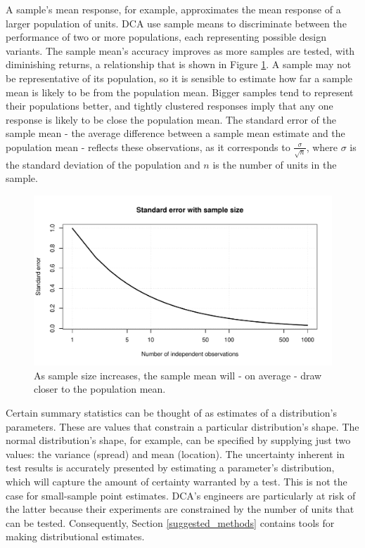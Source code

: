 \documentclass[11pt,a4paper,article]{memoir} %
\begin{document}
 \par
A sample's mean response, for example, approximates the mean response of a larger population of units. DCA use sample means to discriminate between the performance of two or more populations, each representing possible design variants. The sample mean's accuracy improves as more samples are tested, with diminishing returns, a relationship that is shown in Figure \ref{fig:se_with_sample_size}. A sample may not be representative of its population, so it is sensible to estimate how far a sample mean is likely to be from the population mean. Bigger samples tend to represent their populations better, and tightly clustered responses imply that any one response is likely to be close the population mean. The standard error of the sample mean - the average difference between a sample mean estimate and the population mean - reflects these observations, as it corresponds to $\frac{\sigma}{\sqrt{n}}$, where $\sigma$ is the standard deviation of the population and $n$ is the number of units in the sample.
\begin{figure}[h]
\includegraphics[width=\textwidth]{se_with_sample_size.pdf}
\caption{As sample size increases, the sample mean will - on average - draw closer to the population mean.}
\label{fig:se_with_sample_size}
\end{figure}

Certain summary statistics can be thought of as estimates of a distribution's parameters. These are values that constrain a particular distribution's shape. The normal distribution's shape, for example, can be specified by supplying just two values: the variance (spread) and mean (location). The uncertainty inherent in test results is accurately presented by estimating a parameter's distribution, which will capture the amount of certainty warranted by a test. This is not the case for small-sample point estimates. DCA's engineers are particularly at risk of the latter because their experiments are constrained by the number of units that can be tested. Consequently, Section \ref{suggested_methods} contains tools for making distributional estimates.
\end{document}
